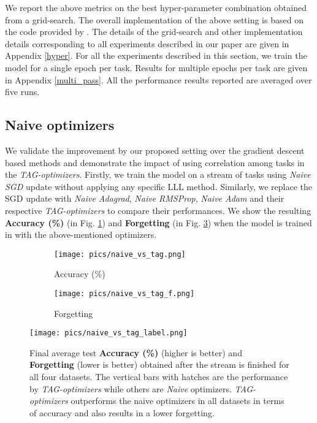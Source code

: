 \documentclass{article} \usepackage{collas2022_conference,times}
\begin{document}
    
    We report the above metrics on the best hyper-parameter combination obtained from a grid-search. The overall implementation of the above setting is based on the code provided by \citep{mirzadeh2020understanding}. The details of the grid-search and other implementation details corresponding to all experiments described in our paper are given in Appendix \ref{hyper}. For all the experiments described in this section, we train the model for a single epoch per task. Results for multiple epochs per task are given in Appendix \ref{multi_pass}. All the performance results reported are averaged over five runs. 



\subsection{Naive optimizers}\label{naive_opt}



    We validate the improvement by our proposed setting over the gradient descent based methods and demonstrate the impact of using correlation among tasks in the \textit{TAG-optimizers}. Firstly, we train the model on a stream of tasks using \textit{Naive SGD} update without applying any specific LLL method. Similarly, we replace the SGD update with \textit{Naive Adagrad}, \textit{Naive RMSProp}, \textit{Naive Adam} and their respective \textit{TAG-optimizers} to compare their performances. We show the resulting \textbf{Accuracy (\%)} (in Fig. \ref{naive_acc_bar}) and \textbf{Forgetting} (in Fig. \ref{naive_forg_bar}) when the model is trained in with the above-mentioned optimizers. 



   \begin{figure}[h!]
        \centering
        \begin{subfigure}[b]{0.33\textwidth}
            \texttt{[image: pics/naive\_vs\_tag.png]}\caption{Accuracy (\%)}\label{naive_acc_bar}
        \end{subfigure}
        \begin{subfigure}[b]{0.33\textwidth}
            \texttt{[image: pics/naive\_vs\_tag\_f.png]}\caption{Forgetting}\label{naive_forg_bar}
        \end{subfigure}
        \texttt{[image: pics/naive\_vs\_tag\_label.png]}
        \caption{Final average test \textbf{Accuracy (\%)} (higher is better) and \textbf{Forgetting} (lower is better) obtained after the stream is finished for all four datasets. The vertical bars with hatches are the performance by \textit{TAG-optimizers} while others are \textit{Naive} optimizers. \textit{TAG-optimizers} outperforms the naive optimizers in all datasets in terms of accuracy and also results in a lower forgetting.}
       
    \end{figure}
\end{document}
